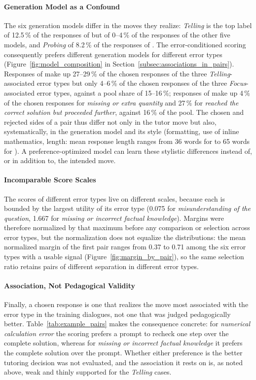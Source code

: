     \paragraph{Generation Model as a Confound}
    The six generation models differ in the moves they realize: \textit{Telling} is the top label of 12.5\,\% of the responses of  but of 0--4\,\% of the responses of the other five models, and \textit{Probing} of 8.2\,\% of the responses of . The error-conditioned scoring consequently prefers different generation models for different error types (Figure~\ref{fig:model_composition} in Section~\ref{subsec:associations_in_pairs}). Responses of  make up 27--29\,\% of the chosen responses of the three \textit{Telling}-associated error types but only 4--6\,\% of the chosen responses of the three \textit{Focus}-associated error types, against a pool share of 15--16\,\%; responses of  make up 4\,\% of the chosen responses for \textit{missing or extra quantity} and 27\,\% for \textit{reached the correct solution but proceeded further}, against 16\,\% of the pool. The chosen and rejected sides of a pair thus differ not only in the tutor move but also, systematically, in the generation model and its style (formatting, use of inline mathematics, length: mean response length ranges from 36 words for  to 65 words for ). A preference-optimized model can learn these stylistic differences instead of, or in addition to, the intended move.


    \paragraph{Incomparable Score Scales}
    The scores of different error types live on different scales, because each is bounded by the largest utility of its error type (0.075 for \textit{misunderstanding of the question}, 1.667 for \textit{missing or incorrect factual knowledge}). Margins were therefore normalized by that maximum before any comparison or selection across error types, but the normalization does not equalize the distributions: the mean normalized margin of the first pair ranges from 0.37 to 0.71 among the six error types with a usable signal (Figure~\ref{fig:margin_by_pair}), so the same selection ratio retains pairs of different separation in different error types.

    \paragraph{Association, Not Pedagogical Validity}
    Finally, a chosen response is one that realizes the move most associated with the error type in the training dialogues, not one that was judged pedagogically better. Table~\ref{tab:example_pairs} makes the consequence concrete: for \textit{numerical calculation error} the scoring prefers a prompt to recheck one step over the complete solution, whereas for \textit{missing or incorrect factual knowledge} it prefers the complete solution over the prompt. Whether either preference is the better tutoring decision was not evaluated, and the association it rests on is, as noted above, weak and thinly supported for the \textit{Telling} cases.
